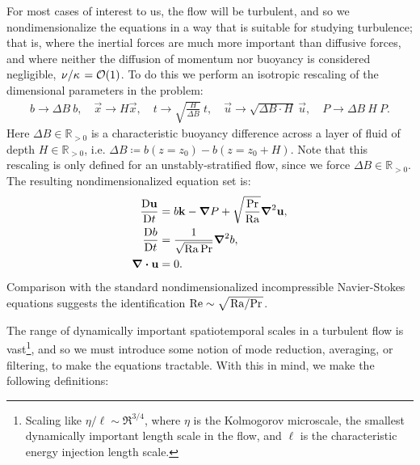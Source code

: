 For most cases of interest to us, the flow will be turbulent, and so we nondimensionalize the equations in a way that is suitable for studying turbulence; that is, where the inertial forces are much more important than diffusive forces, and where neither the diffusion of momentum nor buoyancy is considered negligible, $\flatfrac{\nu}{\kappa} = \mathcal{O}(1)$.
To do this we perform an isotropic rescaling of the dimensional parameters in the problem:
\begin{align}
    b \to \Delta B\ b, 
    \quad
    \vec{x} \to H \vec{x},
    \quad
    t \to \sqrt{\frac{H}{\Delta B}}\ t,
    \quad
    \vec{u} \to \sqrt{\Delta B \cdot H}\ \vec{u},
    \quad
    P \to \Delta B\ H\ P.
\end{align}
Here $\Delta B \in \mathbb{R}_{>0}$ is a characteristic buoyancy difference across a layer of fluid of depth $H \in \mathbb{R}_{>0}$, i.e. $\Delta B \coloneqq b(z = z_0) - b(z = z_0 + H)$.
Note that this rescaling is only defined for an unstably-stratified flow, since we force $\Delta B \in \mathbb{R}_{>0}$.
The resulting nondimensionalized equation set is:
\begin{align}
    \frac{\operatorname{D}\!{\boldsymbol{\mathbf{u}}}}{\operatorname{D}\!{t}}
    &=
    b \boldsymbol{\mathbf{k}}
  - \grad{P}
  + \sqrt{\frac{\operatorname{Pr}}{\operatorname{Ra}}} \grad^2{\boldsymbol{\mathbf{u}}},
    \label{eq:SFBoussinesq_momentum_nonDim}
    \\
    \frac{\operatorname{D}\!{b}}{\operatorname{D}\!{t}}
    &=
    \frac{1}{\sqrt{\operatorname{Ra}\operatorname{Pr}}} \grad^2{b},
    \label{eq:SFBoussinesq_buoyancy_nonDim}
    \\
    \div{\ensuremath{\boldsymbol{\mathbf{u}}}}
    &=
    0.
    \label{eq:SFBoussinesq_mass_nonDim}
\end{align}
Comparison with the standard nondimensionalized incompressible Navier-Stokes equations suggests the identification $\Re \sim \sqrt{\flatfrac{\Ra}{\Pr}}$.

The range of dynamically important spatiotemporal scales in a turbulent flow is vast\footnote{
    Scaling like $\eta/\ell \sim \Re^{3/4}$, where $\eta$ is the Kolmogorov microscale, the smallest dynamically important length scale in the flow, and $\ell$ is the characteristic energy injection length scale.
}, and so we must introduce some notion of mode reduction, averaging, or filtering, to make the equations tractable.
With this in mind, we make the following definitions:

